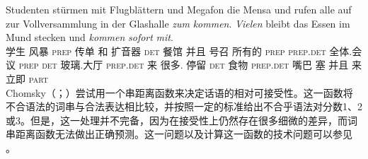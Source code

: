 \ea
\gll Studenten stürmen mit Flugblättern und Megafon die Mensa und rufen alle auf zur Vollversammlung in der Glashalle \emph{zum} \emph{kommen}. \emph{Vielen} bleibt das Essen im Mund stecken und \emph{kommen} \emph{sofort} \emph{mit}.\footnotemark\\
学生 风暴 \textsc{prep} 传单 和 扩音器 \textsc{det} 餐馆 并且 号召 所有的 \textsc{prep} \textsc{prep}.\textsc{det} 全体.会议 \textsc{prep} \textsc{det} 玻璃.大厅 \textsc{prep}.\textsc{det} 来 很多.\dat{} 停留 \textsc{det} 食物 \textsc{prep}.\textsc{det} 嘴巴 塞 并且 来 立即 \textsc{part}\\
\z
Chomsky（\citeyear[\S~5]{Chomsky75a}；\citeyear{Chomsky64a}）尝试用一个串距离函数来决定话语的相对可接受性。这一函数将不合语法的词串与合法表达相比较，并按照一定的标准给出不合乎语法对分数1、2或3。但是，这一处理并不完备，因为在接受性上仍然存在很多细微的差异，而词串距离函数无法做出正确预测。这一问题以及计算这一函数的技术问题可以参见 。

